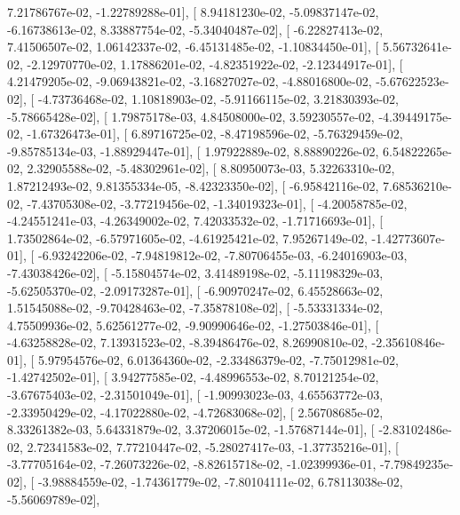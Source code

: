 \documentclass{article}
\begin{document}
          7.21786767e-02,  -1.22789288e-01],
       [  8.94181230e-02,  -5.09837147e-02,  -6.16738613e-02,
          8.33887754e-02,  -5.34040487e-02],
       [ -6.22827413e-02,   7.41506507e-02,   1.06142337e-02,
         -6.45131485e-02,  -1.10834450e-01],
       [  5.56732641e-02,  -2.12970770e-02,   1.17886201e-02,
         -4.82351922e-02,  -2.12344917e-01],
       [  4.21479205e-02,  -9.06943821e-02,  -3.16827027e-02,
         -4.88016800e-02,  -5.67622523e-02],
       [ -4.73736468e-02,   1.10818903e-02,  -5.91166115e-02,
          3.21830393e-02,  -5.78665428e-02],
       [  1.79875178e-03,   4.84508000e-02,   3.59230557e-02,
         -4.39449175e-02,  -1.67326473e-01],
       [  6.89716725e-02,  -8.47198596e-02,  -5.76329459e-02,
         -9.85785134e-03,  -1.88929447e-01],
       [  1.97922889e-02,   8.88890226e-02,   6.54822265e-02,
          2.32905588e-02,  -5.48302961e-02],
       [  8.80950073e-03,   5.32263310e-02,   1.87212493e-02,
          9.81355334e-05,  -8.42323350e-02],
       [ -6.95842116e-02,   7.68536210e-02,  -7.43705308e-02,
         -3.77219456e-02,  -1.34019323e-01],
       [ -4.20058785e-02,  -4.24551241e-03,  -4.26349002e-02,
          7.42033532e-02,  -1.71716693e-01],
       [  1.73502864e-02,  -6.57971605e-02,  -4.61925421e-02,
          7.95267149e-02,  -1.42773607e-01],
       [ -6.93242206e-02,  -7.94819812e-02,  -7.80706455e-03,
         -6.24016903e-03,  -7.43038426e-02],
       [ -5.15804574e-02,   3.41489198e-02,  -5.11198329e-03,
         -5.62505370e-02,  -2.09173287e-01],
       [ -6.90970247e-02,   6.45528663e-02,   1.51545088e-02,
         -9.70428463e-02,  -7.35878108e-02],
       [ -5.53331334e-02,   4.75509936e-02,   5.62561277e-02,
         -9.90990646e-02,  -1.27503846e-01],
       [ -4.63258828e-02,   7.13931523e-02,  -8.39486476e-02,
          8.26990810e-02,  -2.35610846e-01],
       [  5.97954576e-02,   6.01364360e-02,  -2.33486379e-02,
         -7.75012981e-02,  -1.42742502e-01],
       [  3.94277585e-02,  -4.48996553e-02,   8.70121254e-02,
         -3.67675403e-02,  -2.31501049e-01],
       [ -1.90993023e-03,   4.65563772e-03,  -2.33950429e-02,
         -4.17022880e-02,  -4.72683068e-02],
       [  2.56708685e-02,   8.33261382e-03,   5.64331879e-02,
          3.37206015e-02,  -1.57687144e-01],
       [ -2.83102486e-02,   2.72341583e-02,   7.77210447e-02,
         -5.28027417e-03,  -1.37735216e-01],
       [ -3.77705164e-02,  -7.26073226e-02,  -8.82615718e-02,
         -1.02399936e-01,  -7.79849235e-02],
       [ -3.98884559e-02,  -1.74361779e-02,  -7.80104111e-02,
          6.78113038e-02,  -5.56069789e-02],
\end{document}
